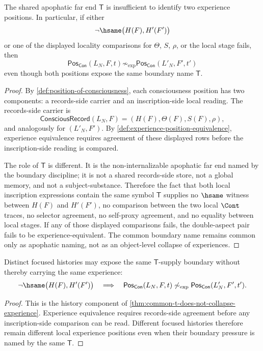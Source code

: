 \begin{theorem}
\label{thm:common-t-does-not-collapse-experience}
The shared apophatic far end $\mathsf{T}$ is insufficient to identify two
experience positions. In particular, if either
$$
\neg\hsame\bigl(H(F),H'(F')\bigr)
$$
or one of the displayed locality comparisons for $\Theta$, $S$, $\rho$,
or the local stage fails, then
$$
\mathsf{Pos}_{\mathsf{Con}}(L_N,F,t)
\not\sim_{\mathrm{exp}}
\mathsf{Pos}_{\mathsf{Con}}(L'_N,F',t')
$$
even though both positions expose the same boundary name $\mathsf{T}$.
\end{theorem}

\begin{proof}
By \autoref{def:position-of-consciousness}, each consciousness position has
two components: a records-side carrier and an inscription-side local
reading. The records-side carrier is
$$
\mathsf{ConsciousRecord}(L_N,F)
=
(H(F),\Theta(F),S(F),\rho),
$$
and analogously for $(L'_N,F')$. By
\autoref{def:experience-position-equivalence}, experience equivalence
requires agreement of these displayed rows before the inscription-side
reading is compared.

The role of $\mathsf{T}$ is different. It is the non-internalizable
apophatic far end named by the boundary discipline; it is not a shared
records-side store, not a global memory, and not a subject-substance.
Therefore the fact that both local inscription expressions contain the
same symbol $\mathsf{T}$ supplies no $\hsame$ witness between $H(F)$ and
$H'(F')$, no comparison between the two local $\Cont$ traces, no selector
agreement, no self-proxy agreement, and no equality between local stages.
If any of those displayed comparisons fails, the double-aspect pair fails
to be experience-equivalent. The common boundary name remains common only
as apophatic naming, not as an object-level collapse of experiences.
\end{proof}

\begin{corollary}
\label{cor:different-histories-share-boundary-name}
Distinct focused histories may expose the same $\mathsf{T}$-supply
boundary without thereby carrying the same experience:
$$
\neg\hsame\bigl(H(F),H'(F')\bigr)
\quad\Longrightarrow\quad
\mathsf{Pos}_{\mathsf{Con}}(L_N,F,t)
\not\sim_{\mathrm{exp}}
\mathsf{Pos}_{\mathsf{Con}}(L'_N,F',t').
$$
\end{corollary}

\begin{proof}
This is the history component of
\autoref{thm:common-t-does-not-collapse-experience}. Experience equivalence
requires records-side agreement before any inscription-side comparison can
be read. Different focused histories therefore remain different local
experience positions even when their boundary pressure is named by the
same $\mathsf{T}$.
\end{proof}

